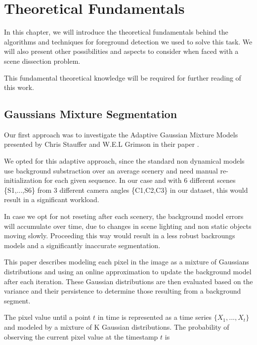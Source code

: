 \section{Theoretical Fundamentals}

In this chapter, we will introduce the theoretical fundamentals behind the algorithms and techniques for foreground detection we used to solve this task. We will also present other possibilities and aspects to consider when faced with a scene dissection  problem. 

This fundamental theoretical knowledge will be required for further reading of this work.

\subsection{Gaussians Mixture Segmentation}

Our first approach was to investigate the Adaptive Gaussian Mixture Models presented by Chris Stauffer and W.E.L Grimson in their paper \linebreak \cite{Adaptive background mixture models for real-time tracking}.

\medskip

We opted for this adaptive approach, since the standard non dynamical models use background substraction over an average scenery and need manual re-initialization for each given sequence. In our case and with 6 different scenes \{S1,...,S6\} from 3 different camera angles \{C1,C2,C3\} in our dataset, this would result in a significant workload.

\medskip

In case we opt for not reseting after each scenery, the background model errors will accumulate over time, due to changes in scene lighting and non static objects moving slowly. Proceeding this way would result in a less robust backroungs models and a significantly inaccurate segmentation.

\medskip

This paper describes modeling each pixel in the image as a mixture of Gaussians distributions and using an online approximation to update the background model after each iteration. These Gaussian distributions are then evaluated based on the variance and their persistence to determine those resulting from a background segment.

\medskip

The pixel value until a point $t$ in time is represented as a time series $\{X_{1}, ..., X_{t}\}$ and modeled by a mixture of K Gaussian distributions. The probability of observing the current pixel value at the timestamp $t$ is

